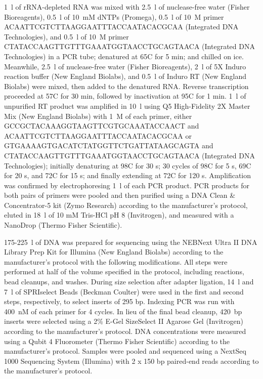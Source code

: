 \documentclass[main.tex]{subfiles}
\begin{document}
1~\textmu l of rRNA-depleted RNA was mixed with 2.5~\textmu l of nuclease-free water (Fisher Bioreagents), 0.5~\textmu l of 10~mM dNTPs (Promega), 0.5~\textmu l of 10~\textmu M primer ACAATTCGTCTTAAGGAATTTACCAATACACGCAA (Integrated DNA Technologies), and 0.5~\textmu l of 10~\textmu M primer CTATACCAAGTTGTTTGAAATGGTAACCTGCAGTAACA (Integrated DNA Technologies) in a PCR tube; denatured at 65\textdegree C for 5 min; and chilled on ice.
Meanwhile, 2.5~\textmu l of nuclease-free water (Fisher Bioreagents), 2~\textmu l of 5X Induro reaction buffer (New England Biolabs), and 0.5~\textmu l of Induro RT (New England Biolabs) were mixed, then added to the denatured RNA.
Reverse transcription proceeded at 57\textdegree C for 30 min, followed by inactivation at 95\textdegree C for 1 min.
1~\textmu l of unpurified RT product was amplified in 10~\textmu l using Q5 High-Fidelity 2X Master Mix (New England Biolabs) with 1~\textmu M of each primer, either GCCGCTACAAAGGTAAGTTCGTGCAAATACCAACT and ACAATTCGTCTTAAGGAATTTACCAATACACGCAA or GTGAAAAGTGACATCTATGGTTCTGATTATAAGCAGTA and CTATACCAAGTTGTTTGAAATGGTAACCTGCAGTAACA (Integrated DNA Technologies); initially denaturing at 98\textdegree C for 30 s; 30 cycles of 98\textdegree C for 5 s, 69\textdegree C for 20 s, and 72\textdegree C for 15 s; and finally extending at 72\textdegree C for 120 s.
Amplification was confirmed by electrophoresing 1~\textmu l of each PCR product.
PCR products for both pairs of primers were pooled and then purified using a DNA Clean \& Concentrator-5 kit (Zymo Research) according to the manufacturer's protocol, eluted in 18~\textmu l of 10 mM Tris-HCl pH 8 (Invitrogen), and measured with a NanoDrop (Thermo Fisher Scientific).

175-225~\textmu l of DNA was prepared for sequencing using the NEBNext Ultra II DNA Library Prep Kit for Illumina (New England Biolabs) according to the manufacturer's protocol with the following modifications.
All steps were performed at half of the volume specified in the protocol, including reactions, bead cleanups, and washes.
During size selection after adapter ligation, 14~\textmu l and 7~\textmu l of SPRIselect Beads (Beckman Coulter) were used in the first and second steps, respectively, to select inserts of 295 bp.
Indexing PCR was run with 400~nM of each primer for 4 cycles.
In lieu of the final bead cleanup, 420~bp inserts were selected using a 2\% E-Gel SizeSelect II Agarose Gel (Invitrogen) according to the manufacturer's protocol.
DNA concentrations were measured using a Qubit 4 Fluorometer (Thermo Fisher Scientific) according to the manufacturer's protocol.
Samples were pooled and sequenced using a NextSeq 1000 Sequencing System (Illumina) with 2 x 150 bp paired-end reads according to the manufacturer's protocol.
\end{document}
